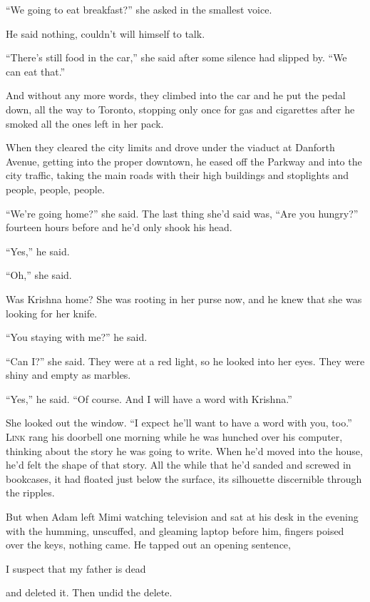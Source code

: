 ``We going to eat breakfast?'' she asked in the smallest voice.

He said nothing, couldn't will himself to talk.

``There's still food in the car,'' she said after some silence had
slipped by.  ``We can eat that.''

And without any more words, they climbed into the car and he put the
pedal down, all the way to Toronto, stopping only once for gas and
cigarettes after he smoked all the ones left in her pack.

When they cleared the city limits and drove under the viaduct at
Danforth Avenue, getting into the proper downtown, he eased off the
Parkway and into the city traffic, taking the main roads with their
high buildings and stoplights and people, people, people.

``We're going home?'' she said.  The last thing she'd said was, ``Are
you hungry?'' fourteen hours before and he'd only shook his head.

``Yes,'' he said.

``Oh,'' she said.

Was Krishna home?  She was rooting in her purse now, and he knew that
she was looking for her knife.

``You staying with me?'' he said.

``Can I?'' she said.  They were at a red light, so he looked into her
eyes.  They were shiny and empty as marbles.

``Yes,'' he said.  ``Of course.  And I will have a word with
Krishna.''

She looked out the window.  ``I expect he'll want to have a word with
you, too.''
\\
\lettrine[lines=3, lhang=.5, nindent=0pt, findent=2pt]{L}{ink} rang his doorbell one morning while he was hunched over his
computer, thinking about the story he was going to write.  When he'd
moved into the house, he'd felt the shape of that story.  All the
while that he'd sanded and screwed in bookcases, it had floated just
below the surface, its silhouette discernible through the ripples.

But when Adam left Mimi watching television and sat at his desk in the
evening with the humming, unscuffed, and gleaming laptop before him,
fingers poised over the keys, nothing came.  He tapped out an opening
sentence,

I suspect that my father is dead

and deleted it.  Then undid the delete.

